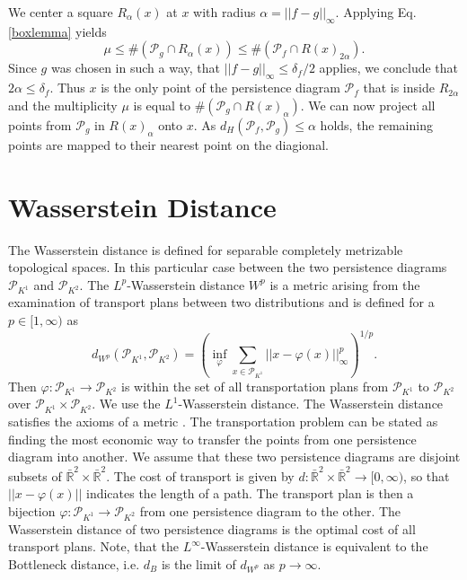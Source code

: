 \documentclass[runningheads]{llncs}
\begin{document}
We center a square $R_\alpha(x)$ at $x$ with radius $\alpha = ||f-g||_\infty$. Applying Eq. \ref{boxlemma} yields
\begin{equation}
\mu \leq \#(\mathcal{P}_g \cap R_\alpha(x)) \leq \#(\mathcal{P}_f \cap R(x)_{2\alpha}).
\end{equation}
Since $g$ was chosen in such a way, that $||f-g||_\infty \leq \delta_f / 2$ applies, we conclude that $2 \alpha \leq \delta_f$. Thus $x$ is the only point of the persistence diagram $\mathcal{P}_f$ that is inside $R_{2\alpha}$ and the multiplicity $\mu$ is equal to $\#(\mathcal{P}_g \cap R(x)_\alpha)$. We can now project all points from $\mathcal{P}_g$ in $R(x)_\alpha$ onto $x$. As $d_H(\mathcal{P}_f, \mathcal{P}_g) \leq \alpha$ holds, the remaining points are mapped to their nearest point on the diagional.

\section{Wasserstein Distance}
The Wasserstein distance is defined for separable completely metrizable topological spaces. In this particular case between the two persistence diagrams $\mathcal{P}_{K^1}$ and $\mathcal{P}_{K^2}$. The $L^p$-Wasserstein distance $W^p$ is a metric arising from the examination of transport plans between two distributions and is defined for a $p \in [1,\infty)$ as
\begin{equation}
d_{W^p}(\mathcal{P}_{K^1},\mathcal{P}_{K^2}) = \left(\inf_{\varphi} \sum_{x \in \mathcal{P}_{K^1}} ||x-\varphi(x)||^p_\infty\right)^{1/p}.
\end{equation}
Then $\varphi: \mathcal{P}_{K^1}\rightarrow \mathcal{P}_{K^2}$ is within the set of all transportation plans from $\mathcal{P}_{K^1}$ to $\mathcal{P}_{K^2}$ over $\mathcal{P}_{K^1} \times \mathcal{P}_{K^2}$. We use the $L^1$-Wasserstein distance. The Wasserstein distance satisfies the axioms of a metric \cite[p.~77]{villani2008optimal}. The transportation problem can be stated as finding the most economic way to transfer the points from one persistence diagram into another. We assume that these two persistence diagrams are disjoint subsets of $\bar{\mathbb{R}}^2 \times \bar{\mathbb{R}}^2$. The cost of transport is given by $d: \bar{\mathbb{R}}^2 \times \bar{\mathbb{R}}^2 \rightarrow [0,\infty)$, so that $||x-\varphi(x)||$ indicates the length of a path. The transport plan is then a bijection $\varphi: \mathcal{P}_{K^1} \rightarrow \mathcal{P}_{K^2}$ from one persistence diagram to the other. The Wasserstein distance of two persistence diagrams is the optimal cost of all transport plans. Note, that the $L^\infty$-Wasserstein distance is equivalent to the Bottleneck distance, i.e. $d_{B}$ is the limit of $d_{W^p}$ as $p \rightarrow \infty$.
\end{document}
